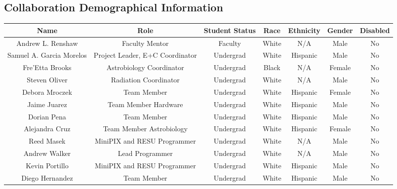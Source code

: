 \begin{appendices}
  \section{Collaboration Demographical Information}
\begin{table}[h!]
\centering  
  \begin{tabular}  { |c|c|c|c|c|c|c|}
  	\hline
      \textbf{Name} &  \textbf{Role} & \textbf{Student Status} & \textbf{Race} & \textbf{Ethnicity} & \textbf{Gender} & \textbf{Disabled}\\
 	\hline
 	Andrew L. Renshaw & Faculty Mentor & Faculty & White & N/A & Male & No\\
 	\hline
 	Samuel A. Garcia Morelos & Project Leader, E+C Coordinator & Undergrad & White & Hispanic & Male & No\\
 	\hline
 	Fre'Etta Brooks & Astrobiology Coordinator & Undergrad & Black & N/A & Female & No\\\hline
 	Steven Oliver & Radiation Coordinator & Undergrad & White & N/A & Male & No\\\hline
 	Debora Mroczek & Team Member & Undergrad & White & Hispanic & Female & No\\\hline
 	Jaime Juarez & Team Member Hardware & Undergrad & White & Hispanic & Male & No\\\hline
 	Dorian Pena & Team Member & Undergrad & White & Hispanic & Male & No\\\hline
 	Alejandra Cruz & Team Member Astrobiology & Undergrad & White & Hispanic & Female & No\\\hline
 	Reed Masek & MiniPIX and RESU Programmer & Undergrad & White & N/A & Male & No\\\hline
 	Andrew Walker & Lead Programmer & Undergrad & White & N/A & Male & No\\\hline
 	Kevin Portillo & MiniPIX and RESU Programmer & Undergrad & White & Hispanic & Male & No
 	\\\hline
 	Diego Hernandez & Team Member & Undergrad & White & Hispanic & Male & No\\
 	\hline
	\end{tabular}	
	\end{table}  

\end{appendices}
